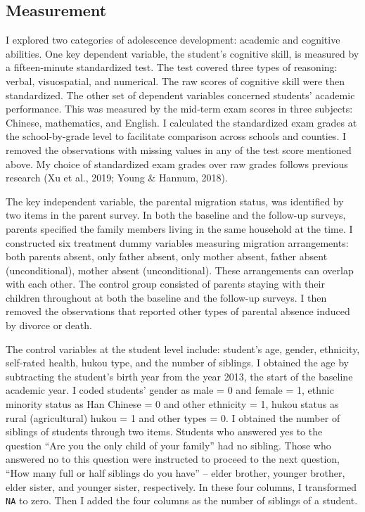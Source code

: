 \documentclass[
  man]{apa7}
\begin{document}
\hypertarget{measurement}{%
\subsection{Measurement}\label{measurement}}

I explored two categories of adolescence development: academic and cognitive abilities. One key dependent variable, the student's cognitive skill, is measured by a fifteen-minute standardized test. The test covered three types of reasoning: verbal, visuospatial, and numerical. The raw scores of cognitive skill were then standardized. The other set of dependent variables concerned students' academic performance. This was measured by the mid-term exam scores in three subjects: Chinese, mathematics, and English. I calculated the standardized exam grades at the school-by-grade level to facilitate comparison across schools and counties. I removed the observations with missing values in any of the test score mentioned above. My choice of standardized exam grades over raw grades follows previous research (Xu et al., 2019; Young \& Hannum, 2018).

The key independent variable, the parental migration status, was identified by two items in the parent survey. In both the baseline and the follow-up surveys, parents specified the family members living in the same household at the time. I constructed six treatment dummy variables measuring migration arrangements: both parents absent, only father absent, only mother absent, father absent (unconditional), mother absent (unconditional). These arrangements can overlap with each other. The control group consisted of parents staying with their children throughout at both the baseline and the follow-up surveys. I then removed the observations that reported other types of parental absence induced by divorce or death.

The control variables at the student level include: student's age, gender, ethnicity, self-rated health, hukou type, and the number of siblings. I obtained the age by subtracting the student's birth year from the year 2013, the start of the baseline academic year. I coded students' gender as male = 0 and female = 1, ethnic minority status as Han Chinese = 0 and other ethnicity = 1, hukou status as rural (agricultural) hukou = 1 and other types = 0. I obtained the number of siblings of students through two items. Students who answered yes to the question ``Are you the only child of your family'' had no sibling. Those who answered no to this question were instructed to proceed to the next question, ``How many full or half siblings do you have'' -- elder brother, younger brother, elder sister, and younger sister, respectively. In these four columns, I transformed \texttt{NA} to zero. Then I added the four columns as the number of siblings of a student.
\end{document}
